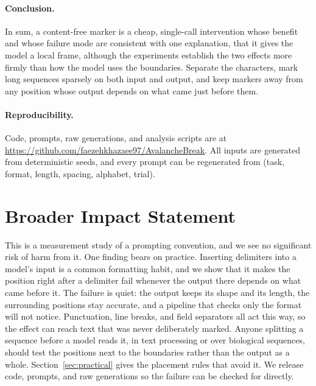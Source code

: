 \documentclass[10pt]{article} %
\begin{document}
\paragraph{Conclusion.} In sum, a content-free marker is a cheap, single-call intervention whose benefit and whose failure mode are consistent with one explanation, that it gives the model a local frame, although the experiments establish the two effects more firmly than how the model uses the boundaries. Separate the characters, mark long sequences sparsely on both input and output, and keep markers away from any position whose output depends on what came just before them.

\paragraph{Reproducibility.} Code, prompts, raw generations, and analysis scripts are at \url{https://github.com/faezehkhazaee97/AvalancheBreak}. All inputs are generated from deterministic seeds, and every prompt can be regenerated from (task, format, length, spacing, alphabet, trial).

\section*{Broader Impact Statement}

This is a measurement study of a prompting convention, and we see no significant risk of harm from it. One finding bears on practice. Inserting delimiters into a model's input is a common formatting habit, and we show that it makes the position right after a delimiter fail whenever the output there depends on what came before it. The failure is quiet: the output keeps its shape and its length, the surrounding positions stay accurate, and a pipeline that checks only the format will not notice. Punctuation, line breaks, and field separators all act this way, so the effect can reach text that was never deliberately marked. Anyone splitting a sequence before a model reads it, in text processing or over biological sequences, should test the positions next to the boundaries rather than the output as a whole. Section~\ref{sec:practical} gives the placement rules that avoid it. We release code, prompts, and raw generations so the failure can be checked for directly.

\FloatBarrier



\appendix
\end{document}
